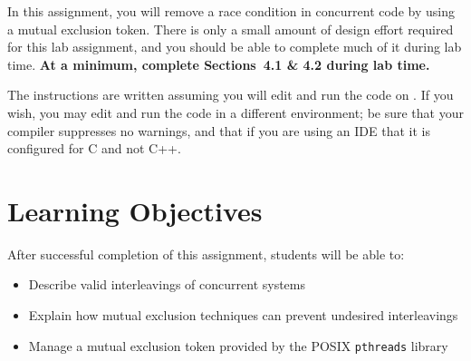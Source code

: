 




\renewcommand{\labnumber}{\duplicatorlabnumber}
\renewcommand{\labname}{Race Condition Elimination Lab}
\renewcommand{\shortlabname}{duplicatorlab}
\renewcommand{\collaborationrules}{\duplicatorlabcollaboration}
\renewcommand{\duedate}{\duplicatorlabdue}

\pagelayout

    \labidentifier

    In this assignment, you will remove a race condition in concurrent code by using a mutual exclusion token.
    There is only a small amount of design effort required for this lab assignment, and you should be able to complete much of it during lab time.
    \textbf{At a minimum, complete Sections~4.1 \& 4.2 during lab time.}

    The instructions are written assuming you will edit and run the code on \runtimeenvironment.
    If you wish, you may edit and run the code in a different environment;
    be sure that your compiler suppresses no warnings, and that if you are using an IDE that it is configured for C and not C++.

\tableofcontents

    \section*{Learning Objectives}

    After successful completion of this assignment, students will be able to:
    \begin{itemize}
        \item Describe valid interleavings of concurrent systems
        \item Explain how mutual exclusion techniques can prevent undesired interleavings
        \item Manage a mutual exclusion token provided by the POSIX \texttt{pthreads} library
    \end{itemize}

